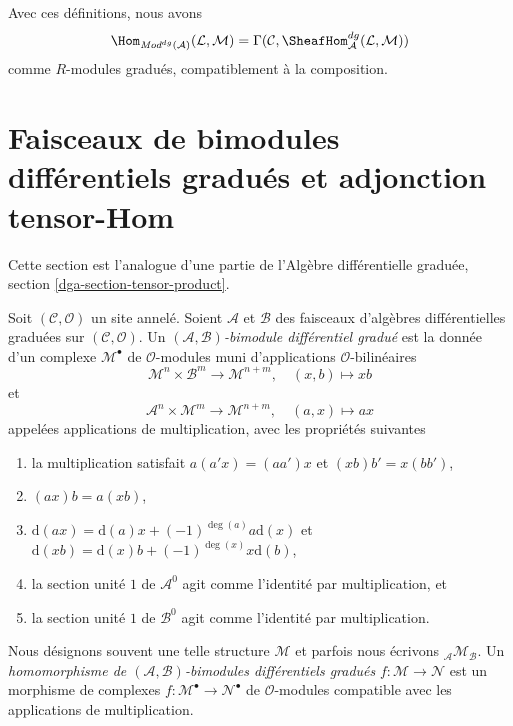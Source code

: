 \medskip\noindent
Avec ces définitions, nous avons
$$
\Hom_{\textit{Mod}^{dg}(\mathcal{A})}(\mathcal{L}, \mathcal{M}) =
\Gamma(\mathcal{C}, \SheafHom^{dg}_\mathcal{A}(\mathcal{L}, \mathcal{M}))
$$ comme
$R$-modules gradués, compatiblement à la composition.









\section{Faisceaux de bimodules différentiels gradués et adjonction tensor-Hom}
\label{section-dg-bimodules}

\noindent
Cette section est l'analogue d'une partie de
l'Algèbre différentielle graduée, section \ref{dga-section-tensor-product}.

\begin{definition}
\label{definition-dg-bimodule}
Soit $(\mathcal{C}, \mathcal{O})$ un site annelé. Soient $\mathcal{A}$ et
$\mathcal{B}$ des faisceaux d'algèbres différentielles graduées sur
$(\mathcal{C}, \mathcal{O})$. Un
{\it $(\mathcal{A}, \mathcal{B})$-bimodule différentiel gradué} est
la donnée d'un complexe $\mathcal{M}^\bullet$
de $\mathcal{O}$-modules muni d'applications $\mathcal{O}$-bilinéaires
$$
\mathcal{M}^n \times \mathcal{B}^m \to \mathcal{M}^{n + m},\quad
(x, b) \longmapsto xb
$$
et
$$
\mathcal{A}^n \times \mathcal{M}^m \to \mathcal{M}^{n + m},\quad (a,
x) \longmapsto ax
$$
appelées applications de multiplication, avec les propriétés suivantes
\begin{enumerate}
\item la multiplication satisfait $a(a'x) = (aa')x$
et $(xb)b' = x(bb')$,
\item $(ax)b = a(xb)$,
\item $\text{d}(ax) = \text{d}(a) x + (-1)^{\deg(a)}a \text{d}(x)$ et
$\text{d}(xb) = \text{d}(x) b + (-1)^{\deg(x)}x \text{d}(b)$,
\item la section unité $1$ de $\mathcal{A}^0$ agit comme l'identité par
multiplication, et
\item la section unité $1$ de
$\mathcal{B}^0$ agit comme l'identité par multiplication.
\end{enumerate} Nous désignons
souvent une telle structure $\mathcal{M}$ et parfois nous écrivons
${}_\mathcal{A}\mathcal{M}_\mathcal{B}$. Un
{\it homomorphisme de
$(\mathcal{A}, \mathcal{B})$-bimodules différentiels gradués}
$f : \mathcal{M} \to \mathcal{N}$ est un morphisme de complexes
$f : \mathcal{M}^\bullet \to \mathcal{N}^\bullet$ de
$\mathcal{O}$-modules compatible avec les applications de multiplication.
\end{definition}

